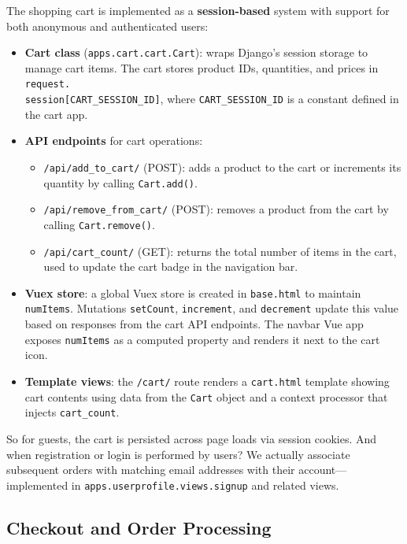 The shopping cart is implemented as a \textbf{session-based} system with support for both anonymous and authenticated users:

\begin{itemize}
  \item \textbf{Cart class} (\texttt{apps.cart.cart.Cart}): wraps Django’s session storage to manage cart items. The cart stores product IDs, quantities, and prices in \texttt{request.\\session[CART\_SESSION\_ID]}, where \texttt{CART\_SESSION\_ID} is a constant defined in the cart app.
  \item \textbf{API endpoints} for cart operations:
  \begin{itemize}
    \item \texttt{/api/add\_to\_cart/} (POST): adds a product to the cart or increments its quantity by calling \texttt{Cart.add()}.
    \item \texttt{/api/remove\_from\_cart/} (POST): removes a product from the cart by calling \texttt{Cart.remove()}.
    \item \texttt{/api/cart\_count/} (GET): returns the total number of items in the cart, used to update the cart badge in the navigation bar.
  \end{itemize}
  \item \textbf{Vuex store}: a global Vuex store is created in \texttt{base.html} to maintain \texttt{numItems}. Mutations \texttt{setCount}, \texttt{increment}, and \texttt{decrement} update this value based on responses from the cart API endpoints. The navbar Vue app exposes \texttt{numItems} as a computed property and renders it next to the cart icon.
  \item \textbf{Template views}: the \texttt{/cart/} route renders a \texttt{cart.html} template showing cart contents using data from the \texttt{Cart} object and a context processor that injects \texttt{cart\_count}.
\end{itemize}

So for guests, the cart is persisted across page loads via session cookies. And when registration or login is performed by users? We actually associate subsequent orders with matching email addresses with their account—implemented in \texttt{apps.userprofile.views.signup} and related views.



\subsection{Checkout and Order Processing}

